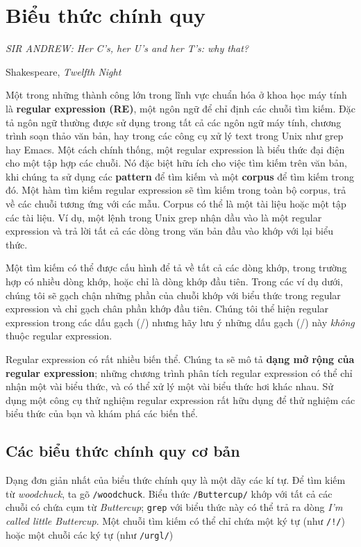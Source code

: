 \section{Biểu thức chính quy}

\setlength{}
\epigraphfontsize{\small}
\epigraph{
{\textit{SIR ANDREW: \hspace{0.5cm}Her C’s, her U’s and her T’s: why that?}
}
}{Shakespeare, \textit{Twelfth Night}}

Một trong những thành công lớn trong lĩnh vực chuẩn hóa ở khoa học máy tính là \textbf{regular expression (RE)}, một ngôn ngữ để chỉ định các chuỗi tìm kiếm. Đặc tả ngôn ngữ thường được sử dụng trong tất cả các ngôn ngữ máy tính, chương trình soạn thảo văn bản, hay trong các công cụ xử lý text trong Unix như grep hay Emacs. Một cách chính thống, một regular expression là biểu thức đại điện cho một tập hợp các chuỗi. Nó đặc biệt hữu ích cho việc tìm kiếm trên văn bản, khi chúng ta sử dụng các \textbf{pattern} để tìm kiếm và một \textbf{corpus} để tìm kiếm trong đó. Một hàm tìm kiếm regular expression sẽ tìm kiếm trong toàn bộ corpus, trả về các chuỗi tương ứng với các mẫu. Corpus có thể là một tài liệu hoặc một tập các tài liệu. Ví dụ, một lệnh trong Unix grep nhận dầu vào là một regular expression và trả lời tất cả các dòng trong văn bản đầu vào khớp với lại biểu thức.

Một tìm kiếm có thể được cấu hình để tả về tất cả các dòng khớp, trong trường hợp có nhiều dòng khớp, hoặc chỉ là dòng khớp đầu tiên. Trong các ví dụ dưới, chúng tôi sẽ gạch chận những phần của chuỗi khớp với biểu thức trong regular expression và chỉ gạch chân phần khớp đầu tiên. Chúng tôi thể hiện regular expression trong các dấu gạch (/) nhưng hãy lưu ý những dấu gạch (/) này \textit{không} thuộc regular expression.

Regular expression có rất nhiều biến thể. Chúng ta sẽ mô tả \textbf{dạng mở rộng của regular expression}; những chương trình phân tích regular expression có thể chỉ nhận một vài biểu thức, và có thể xử lý một vài biểu thức hơi khác nhau. Sử dụng một công cụ thử nghiệm regular expression rất hữu dụng để thử nghiệm các biểu thức của bạn và khám phá các biến thể.

\subsection{Các biểu thức chính quy cơ bản}

Dạng đơn giản nhất của biểu thức chính quy là một dãy các kí tự. Để tìm kiếm từ \textit{woodchuck}, ta gõ \verb|/woodchuck|. Biểu thức \verb|/Buttercup/| khớp với tất cả các chuỗi có chứa cụm từ \textit{Buttercup}; \verb|grep| với biểu thức này có thể trả ra dòng \textit{I'm called little Buttercup}. Một chuỗi tìm kiếm có thể chỉ chứa một ký tự (như \verb|/!/|) hoặc một chuỗi các ký tự (như \verb|/urgl/|)

